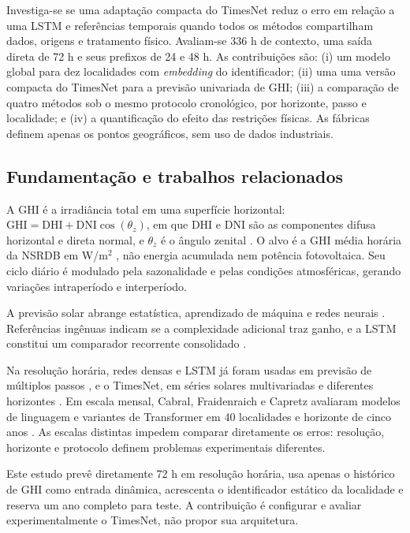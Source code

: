 \documentclass[10pt,conference,a4paper]{IEEEtran}
\begin{document}
Investiga-se se uma adaptação compacta do TimesNet reduz o erro em relação a
uma LSTM e referências temporais quando todos os métodos compartilham dados,
origens e tratamento físico. Avaliam-se 336 h de contexto, uma saída direta de
72 h e seus prefixos de 24 e 48 h. As contribuições são: (i) um modelo global
para dez localidades com \textit{embedding} do identificador; (ii) uma
uma versão compacta do TimesNet para a previsão univariada de GHI; (iii) a comparação
de quatro métodos sob o mesmo protocolo cronológico, por horizonte, passo e
localidade; e (iv) a quantificação do efeito das restrições físicas. As
fábricas definem apenas os pontos geográficos, sem uso de dados industriais.

\subsection{Fundamentação e trabalhos relacionados}
\label{sec:fundamentacao}

A GHI é a irradiância total em uma superfície horizontal:
$\mathrm{GHI}=\mathrm{DHI}+\mathrm{DNI}\cos(\theta_z)$, em que DHI e DNI são
as componentes difusa horizontal e direta normal, e $\theta_z$ é o ângulo
zenital \cite{duffie2013}. O alvo é a GHI média horária da NSRDB em W/m$^2$
\cite{sengupta2018}, não energia acumulada nem potência fotovoltaica. Seu ciclo
diário é modulado pela sazonalidade e pelas condições atmosféricas, gerando
variações intraperíodo e interperíodo.

A previsão solar abrange estatística, aprendizado de máquina e redes neurais
\cite{voyant2017,voyant2022}. Referências ingênuas indicam se a complexidade
adicional traz ganho, e a LSTM constitui um comparador recorrente consolidado
\cite{hochreiter1997}.

Na resolução horária, redes densas e LSTM já foram usadas em previsão de
múltiplos passos \cite{guariso2020}, e o TimesNet, em séries solares
multivariadas e diferentes horizontes \cite{zhu2024}. Em escala mensal,
Cabral, Fraidenraich e Capretz avaliaram modelos de linguagem e variantes de
Transformer em 40 localidades e horizonte de cinco anos \cite{cabral2026}.
As escalas distintas impedem comparar diretamente os erros: resolução,
horizonte e protocolo definem problemas experimentais diferentes.

Este estudo prevê diretamente 72 h em resolução horária, usa apenas o
histórico de GHI como entrada dinâmica, acrescenta o identificador estático da
localidade e reserva um ano completo para teste. A contribuição é configurar
e avaliar experimentalmente o TimesNet, não propor sua arquitetura.
\end{document}
